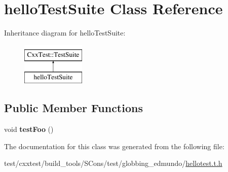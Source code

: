 \hypertarget{classhelloTestSuite}{\section{hello\-Test\-Suite Class Reference}
\label{classhelloTestSuite}
}
Inheritance diagram for hello\-Test\-Suite\-:\begin{figure}[H]
\begin{center}
\leavevmode
\includegraphics[height=2.000000cm]{classhelloTestSuite}
\end{center}
\end{figure}
\subsection*{Public Member Functions}
\begin{DoxyCompactItemize}
\item 
\hypertarget{classhelloTestSuite_aeedd94647d10c1b7658facae84cee7d0}{void {\bfseries test\-Foo} ()}\label{classhelloTestSuite_aeedd94647d10c1b7658facae84cee7d0}

\end{DoxyCompactItemize}


The documentation for this class was generated from the following file\-:\begin{DoxyCompactItemize}
\item 
test/cxxtest/build\-\_\-tools/\-S\-Cons/test/globbing\-\_\-edmundo/\hyperlink{hellotest_8t_8h}{hellotest.\-t.\-h}\end{DoxyCompactItemize}
